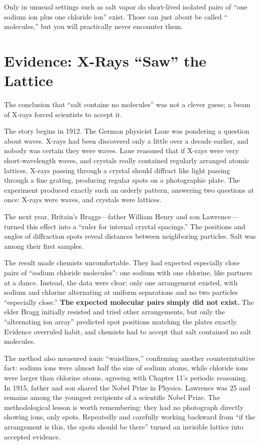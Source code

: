 Only in unusual settings such as salt vapor do short-lived isolated pairs of ``one sodium ion plus one chloride ion'' exist. Those can just about be called `` molecules,'' but you will practically never encounter them.

\section{Evidence: X-Rays ``Saw'' the Lattice}

\begin{zhengju}
The conclusion that ``salt contains no molecules'' was not a clever guess; a beam of X-rays forced scientists to accept it.

The story begins in 1912. The German physicist Laue was pondering a question about waves. X-rays had been discovered only a little over a decade earlier, and nobody was certain they were waves. Laue reasoned that if X-rays were very short-wavelength waves, and crystals really contained regularly arranged atomic lattices, X-rays passing through a crystal should diffract like light passing through a fine grating, producing regular spots on a photographic plate. The experiment produced exactly such an orderly pattern, answering two questions at once: X-rays were waves, and crystals were lattices.

The next year, Britain's Braggs---father William Henry and son Lawrence---turned this effect into a ``ruler for internal crystal spacings.'' The positions and angles of diffraction spots reveal distances between neighboring particles. Salt was among their first samples.

The result made chemists uncomfortable. They had expected especially close pairs of ``sodium chloride molecules'': one sodium with one chlorine, like partners at a dance. Instead, the data were clear: only one arrangement existed, with sodium and chlorine alternating at uniform separations and no two particles ``especially close.'' \textbf{The expected molecular pairs simply did not exist.} The elder Bragg initially resisted and tried other arrangements, but only the ``alternating ion array'' predicted spot positions matching the plates exactly. Evidence overruled habit, and chemists had to accept that salt contained no salt molecules.

The method also measured ionic ``waistlines,'' confirming another counterintuitive fact: sodium ions were almost half the size of sodium atoms, while chloride ions were larger than chlorine atoms, agreeing with Chapter 11's periodic reasoning. In 1915, father and son shared the Nobel Prize in Physics. Lawrence was 25 and remains among the youngest recipients of a scientific Nobel Prize. The methodological lesson is worth remembering: they had no photograph directly showing ions, only spots. Repeatedly and carefully working backward from ``if the arrangement is this, the spots should be there'' turned an invisible lattice into accepted evidence.
\end{zhengju}

